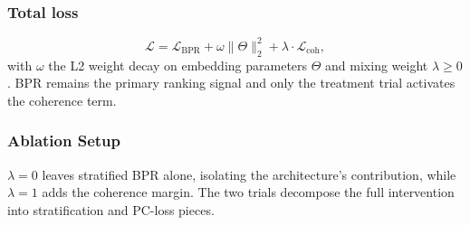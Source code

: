 \subsubsection{Total loss}
\begin{equation}
\mathcal{L} = \mathcal{L}_{\text{BPR}} + \omega \|\Theta\|_2^2 + \lambda \cdot \mathcal{L}_{\text{coh}},
\end{equation}
with $\omega$ the L2 weight decay on embedding parameters $\Theta$ and mixing weight $\lambda \geq 0$. BPR remains the primary ranking signal and only the treatment trial activates the coherence term.

\subsubsection{Ablation Setup}
$\lambda = 0$ leaves stratified BPR alone, isolating the architecture's contribution, while $\lambda = 1$ adds the coherence margin. The two trials decompose the full intervention into stratification and PC-loss pieces.
